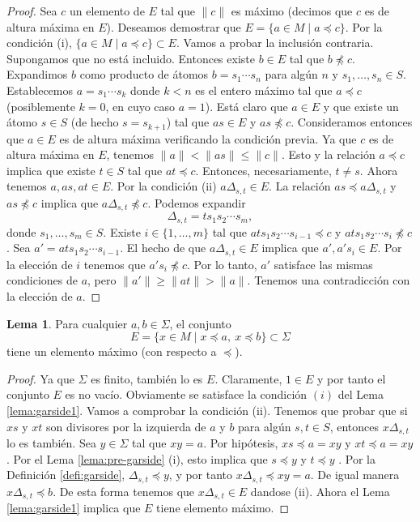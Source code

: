 \documentclass[12pt]{book}
\theoremstyle{definition}
\newtheorem{lema}{Lema}[section]
\providecommand{\norm}[1]{\lVert#1\rVert}
\begin{document}
\begin{proof} Sea $c$ un elemento de $E$ tal que $\norm{c}$ es máximo (decimos que $c$ es de altura máxima en $E$). Deseamos demostrar que $E=\{a\in M\mid a\preceq c\}$. Por la condición (i), $\{a\in M\mid a\preceq c\}\subset E$. Vamos a probar la inclusión contraria. Supongamos que no está incluido. Entonces existe $b\in E$ tal que $b\npreceq c$. Expandimos $b$ como producto de átomos $b=s_1\cdots s_n$ para algún $n$ y $s_1,\ldots,s_n\in S$. Establecemos $a=s_1\cdots s_k$ donde $k < n$ es el entero máximo tal que $a\preceq c$ (posiblemente $k=0$, en cuyo caso $a=1$). Está claro que $a\in E$ y que existe un átomo $s\in S$ (de hecho $s=s_{k+1}$) tal que $as\in E$ y $as\npreceq c$. Consideramos entonces que $a\in E$ es de altura máxima verificando la condición previa. Ya que $c$ es de altura máxima en $E$, tenemos $\norm{a}<\norm{as}\leq \norm{c}$. Esto y la relación $a\preceq c$ implica que existe $t\in S$ tal que $at\preceq c$. Entonces, necesariamente, $t\neq s$. Ahora tenemos  $a,as, at\in E$. Por la condición (ii) $a\Delta_{s,t}\in E$. La relación $as\preceq a\Delta_{s,t}$ y $as\npreceq c$ implica que $a\Delta_{s,t}\npreceq c$. Podemos expandir
$$\Delta_{s,t}=ts_1s_2\cdots s_m,$$
donde $s_1,\ldots,s_m\in S$. Existe $i\in\{1,\ldots,m\}$ tal que $ats_1s_2\cdots s_{i-1}\preceq c$ y $ats_1s_2\cdots s_{i}\npreceq c$. Sea $a'=ats_1s_2\cdots s_{i-1}$. El hecho de que $a\Delta_{s,t}\in E$ implica que $a',a's_i\in E$. Por la elección de $i$ tenemos que $a's_i\npreceq c$. Por lo tanto, $a'$ satisface las mismas condiciones de $a$, pero $\norm{a'}\geq \norm{at}> \norm{a}$. Tenemos una contradicción con la elección de $a$.\end{proof}

\begin{lema}
Para cualquier $a,b\in\Sigma$, el conjunto
$$E=\{x\in M\mid x\preceq a,\ x\preceq b\}\subset \Sigma$$
tiene un elemento máximo (con respecto a $\preceq$).
\label{lema:garside2}
\end{lema}

\begin{proof} Ya que $\Sigma$ es finito, también lo es $E$. Claramente, $1\in E$ y por tanto el conjunto $E$ es no vacío. Obviamente se satisface la condición $(i)$ del Lema \ref{lema:garside1}. Vamos a comprobar la condición (ii). Tenemos que probar que si $xs$ y $xt$ son divisores por la izquierda de $a$ y $b$ para algún $s,t\in S$, entonces $x\Delta_{s,t}$ lo es también. Sea $y\in\Sigma$ tal que $xy=a$. Por hipótesis, $xs\preceq a = xy$ y $xt\preceq a = xy$. Por el Lema \ref{lema:pre-garside} (i), esto implica que $s\preceq y$ y $t\preceq y$ . Por la Definición \ref{defi:garside}, $\Delta_{s,t}\preceq y$, y por tanto $x\Delta_{s,t}\preceq xy=a$. De igual manera $x\Delta_{s,t}\preceq b$. De esta forma tenemos que $x\Delta_{s,t}\in E$ dandose (ii). Ahora el Lema \ref{lema:garside1} implica que $E$ tiene elemento máximo.
\end{proof}
\end{document}
